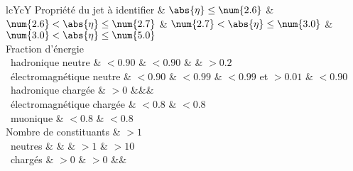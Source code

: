 \begin{tabularx}{\textwidth}{lcYcY}
\toprule
Propriété du jet à identifier & $\abs{\eta}\leq\num{2.6}$ & $\num{2.6}<\abs{\eta}\leq\num{2.7}$ & $\num{2.7}<\abs{\eta}\leq\num{3.0}$ & $\num{3.0}<\abs{\eta}\leq\num{5.0}$ \\
\midrule
Fraction d'énergie\\
\ hadronique neutre & $<\num{0.90}$ & $<\num{0.90}$ &  & $>\num{0.2}$ \\
\ électromagnétique neutre & $<\num{0.90}$ & $<\num{0.99}$ & $<\num{0.99}$ et $>\num{0.01}$ & $<\num{0.90}$ \\
\ hadronique chargée & $>\num{0}$ &&&\\
\ électromagnétique chargée & $<\num{0.8}$ & $<\num{0.8}$ \\
\ muonique & $<\num{0.8}$ & $<\num{0.8}$ \\
\midrule
Nombre de constituants & $>\num{1}$\\
\ neutres & & & $>\num{1}$ & $>\num{10}$ \\
\ chargés & $>\num{0}$ & $>\num{0}$ &&\\
\bottomrule
\end{tabularx}
